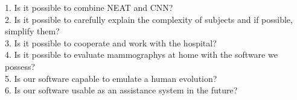 1.	Is it possible to combine NEAT and CNN?\\
2.	Is it possible to carefully explain the complexity of subjects and if possible, simplify them?\\
3.	Is it possible to cooperate and work with the hospital?\\
4.	Is it possible to evaluate mammographys at home with the software we possess?\\
5.	Is our software capable to emulate a human evolution?\\
6.	Is our software usable as an assistance system in the future?\\
